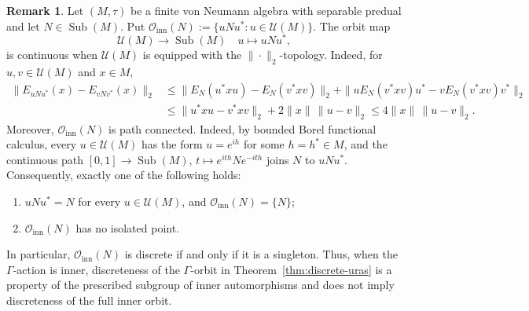 \documentclass[12pt]{amsart} %
\theoremstyle{plain}
\theoremstyle{definition}
\newtheorem{remark}[theorem]{Remark}
\newcommand{\Ucal}{\mathcal{U}}
\DeclareMathOperator{\Sub}{Sub}
\begin{document}
\begin{remark}\label{rmk:inner-orbit-continuity}
Let $(M,\tau)$ be a finite von Neumann algebra with separable predual and
let $N\in\Sub(M)$. Put $\mathcal O_{\mathrm{inn}}(N):=
\{uNu^*:u\in\Ucal(M)\}$. The orbit map
$$\Ucal(M)\to\Sub(M)\quad u\mapsto uNu^*,$$
is continuous when $\Ucal(M)$ is equipped with the $\|\cdot\|_2$-topology.
Indeed, for $u,v\in\Ucal(M)$ and $x\in M$,
$$
\begin{aligned}
\|E_{uNu^*}(x)-E_{vNv^*}(x)\|_2
&\leq
\|E_N(u^*xu)-E_N(v^*xv)\|_2
+
\|uE_N(v^*xv)u^*-vE_N(v^*xv)v^*\|_2\\
&\leq
\|u^*xu-v^*xv\|_2+2\|x\|\,\|u-v\|_2
\leq4\|x\|\,\|u-v\|_2.
\end{aligned}
$$
\noindent Moreover, $\mathcal O_{\mathrm{inn}}(N)$ is path connected. Indeed, by
bounded Borel functional calculus, every $u\in\Ucal(M)$ has the form
$u=e^{ih}$ for some $h=h^*\in M$, and the continuous path $[0,1]\to\Sub(M)$, $t\mapsto e^{ith}Ne^{-ith}$
joins $N$ to $uNu^*$. Consequently, exactly one of the following holds:
\begin{enumerate}
\item $uNu^*=N$ for every $u\in\Ucal(M)$, and
$\mathcal O_{\mathrm{inn}}(N)=\{N\}$;
\item $\mathcal O_{\mathrm{inn}}(N)$ has no isolated point.
\end{enumerate}
In particular, $\mathcal O_{\mathrm{inn}}(N)$ is discrete if and only if it
is a singleton. Thus, when the $\Gamma$-action is inner, discreteness of the
$\Gamma$-orbit in Theorem~\ref{thm:discrete-uras} is a property of the
prescribed subgroup of inner automorphisms and does not imply discreteness
of the full inner orbit.
\end{remark}
\end{document}
